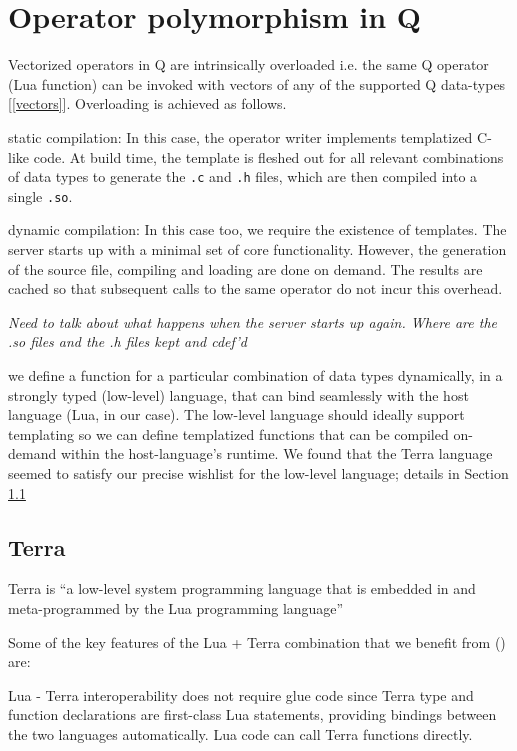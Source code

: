 \section{Operator polymorphism in Q}

Vectorized operators in Q are intrinsically overloaded i.e. the same Q operator (Lua function) can be invoked with vectors of any of the supported Q data-types [\ref{vectors}].
Overloading is achieved as follows.
\be
\item static compilation: In this case, the operator writer implements
  templatized C-like code. At build time, the template is fleshed out for all
  relevant combinations of data types to generate the \verb+.c+ and \verb+.h+
  files, which are then compiled into a single \verb+.so+.
\item dynamic compilation: 
  In this case too, we require the existence of templates. 
  The server starts up with a minimal set of core functionality. 
  However, the generation of the source file, compiling and loading
  are done on demand. The results are cached
  so that subsequent calls to the same operator do not incur this overhead.

  {\em Need to talk about what happens when  the server starts up again. Where
  are the .so files and the .h files kept and cdef'd}

\item we define a function for a particular combination of data types
  dynamically, in a strongly typed (low-level) language, that can bind seamlessly
  with the host language (Lua, in our case). The low-level language should ideally support templating so we can define templatized functions that can be compiled on-demand within the host-language's runtime.
  We found that the Terra language seemed to satisfy our precise wishlist for the low-level language; details in Section \ref{Terra} 
  \ee

\subsection{Terra} 
\label{Terra} 

Terra is ``a low-level system programming language that is embedded in and
meta-programmed by the Lua programming language'' \cite{devito15xx}

Some of the key features of the Lua + Terra combination that we benefit from (\cite{devito15xx}) are:
\be
\item Lua - Terra interoperability does not require glue code since Terra type and function declarations are first-class Lua statements, providing bindings between the two languages automatically. Lua code can call Terra functions directly.

